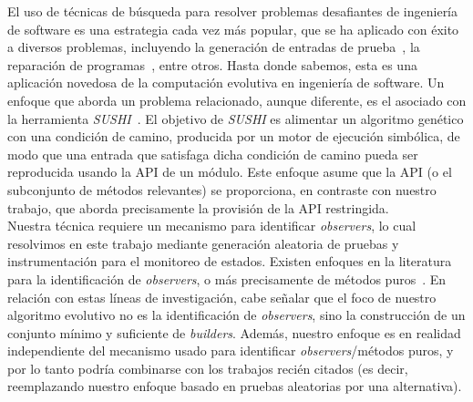 El uso de técnicas de búsqueda para resolver problemas desafiantes de ingeniería 
de software es una estrategia cada vez más popular, que se ha aplicado con éxito 
a diversos problemas, incluyendo la generación de entradas de prueba~\cite{ref11}, 
la reparación de programas~\cite{ref18}, entre otros. Hasta donde sabemos, esta es 
una aplicación novedosa de la computación evolutiva en ingeniería de software. 
Un enfoque que aborda un problema relacionado, aunque diferente, es el asociado 
con la herramienta \textit{SUSHI}~\cite{ref5}. El objetivo de \textit{SUSHI} es alimentar un 
algoritmo genético con una condición de camino, producida por un motor de 
ejecución simbólica, de modo que una entrada que satisfaga dicha condición de 
camino pueda ser reproducida usando la API de un módulo. Este enfoque asume 
que la API (o el subconjunto de métodos relevantes) se proporciona, en contraste 
con nuestro trabajo, que aborda precisamente la provisión de la API restringida. \\

Nuestra técnica requiere un mecanismo para identificar \textit{observers}, lo cual 
resolvimos en este trabajo mediante generación aleatoria de pruebas y 
instrumentación para el monitoreo de estados. Existen enfoques en la literatura 
para la identificación de \textit{observers}, o más precisamente de métodos puros~\cite{ref14,ref28}. 
En relación con estas líneas de investigación, cabe señalar que el foco de nuestro 
algoritmo evolutivo no es la identificación de \textit{observers}, sino la construcción de 
un conjunto mínimo y suficiente de \textit{builders}. Además, nuestro enfoque es en 
realidad independiente del mecanismo usado para identificar \textit{observers}/métodos 
puros, y por lo tanto podría combinarse con los trabajos recién citados (es decir, 
reemplazando nuestro enfoque basado en pruebas aleatorias por una alternativa). 
